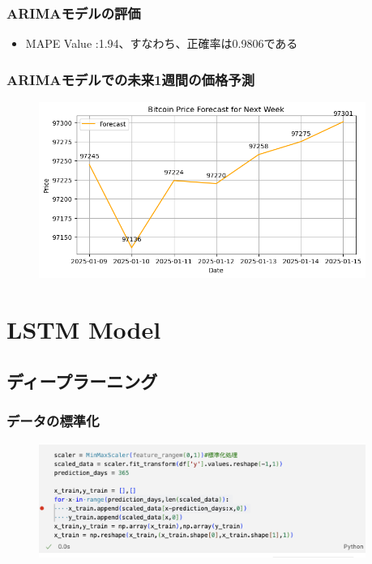 \documentclass{beamer}  %
\begin{document}
\begin{frame}
    \frametitle{ARIMAモデルの評価}
    \begin{itemize}
        \item MAPE Value :1.94、すなわち、正確率は0.9806である
    \end{itemize}
\end{frame}


\begin{frame}
    \frametitle{ARIMAモデルでの未来1週間の価格予測}
    \begin{figure}[h]
        \begin{center}
            \includegraphics[keepaspectratio, width=0.95\textwidth]{pic/ar2.png}\\
        \end{center}
    \end{figure}
\end{frame}

\section{LSTM Model}

\subsection{ディープラーニング}
\begin{frame}
    \frametitle{データの標準化}
    \begin{figure}[h]
        \begin{center}
            \includegraphics[keepaspectratio, width=0.95\textwidth]{pic/dl0.png}\\
        \end{center}
    \end{figure}
\end{frame}
\end{document}
